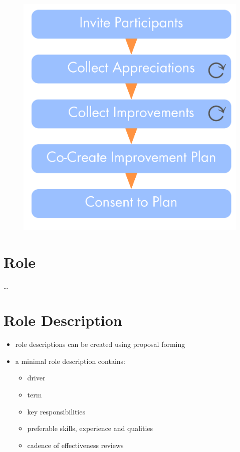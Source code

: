 \begin{figure}[htbp]
\centering
\includegraphics[keepaspectratio,width=\textwidth,height=0.75\textheight]{img/people-and-roles/effectiveness-review.png}
\end{figure}

\section{Role}
\label{role}

{\ldots}

\section{Role Description}
\label{roledescription}

\begin{itemize}
\item role descriptions can be created using proposal forming

\item a minimal role description contains:

\begin{itemize}
\item driver

\item term

\item key responsibilities

\item preferable skills, experience and qualities

\item cadence of effectiveness reviews

\end{itemize}

\end{itemize}

